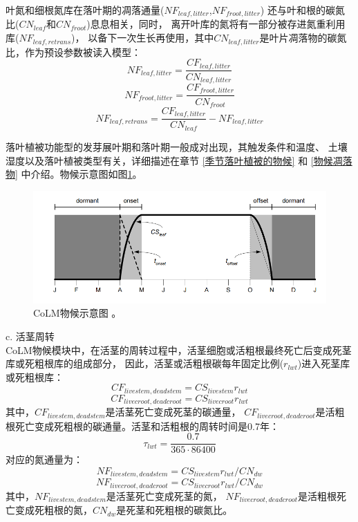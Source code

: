 叶氮和细根氮库在落叶期的凋落通量($NF_{leaf,litter}$,$NF_{froot,litter}$)
还与叶和根的碳氮比($CN_{leaf}$和$CN_{froot}$)息息相关，同时，
离开叶库的氮将有一部分被存进氮重利用库($NF_{leaf,retrans}$)，
以备下一次生长再使用，其中$CN_{leaf,litter}$是叶片凋落物的碳氮比，作为预设参数被读入模型：
\begin{equation}
N F_{leaf,litter}=\frac{CF_{leaf,litter}}{CN_{leaf,litter}}
\end{equation}
\begin{equation}
N F_{froot,litter}=\frac{CF_{froot,litter}}{CN_{froot}}
\end{equation}
\begin{equation}
N F_{leaf, retrans}=\frac{CF_{leaf,litter}}{CN_{leaf}}-NF_{leaf,litter}
\end{equation}


落叶植被功能型的发芽展叶期和落叶期一般成对出现，其触发条件和温度、
土壤湿度以及落叶植被类型有关，详细描述在章节 \ref{季节落叶植被的物候} 和 \ref{物候凋落物} 中介绍。物候示意图如图\ref{fig:CoLM物候示意图}。\\

{
\begin{figure}[]
\centering
\includegraphics{Figures/植被生物地球化学循环过程/CoLM物候示意图.png}
\caption{CoLM物候示意图 \citep{lawrence2018}。 }
\label{fig:CoLM物候示意图}
\end{figure}
}
c. 活茎周转\\
CoLM物候模块中，在活茎的周转过程中，活茎细胞或活粗根最终死亡后变成死茎库或死粗根库的组成部分，
因此，活茎或活粗根碳每年固定比例($r_{lwt}$)进入死茎库或死粗根库：
\begin{equation}
CF_{ {livestem,deadstem }}=CS_{ {livestem }} r_{l w t}
\end{equation}
\begin{equation}
CF_{ {livecroot,deadcroot }}=CS_{ {livecroot }} r_{ {lwt }}
\end{equation}
其中，$CF_{livestem,deadstem}$是活茎死亡变成死茎的碳通量，
$CF_{livecroot,deadcroot}$是活粗根死亡变成死粗根的碳通量。活茎和活粗根的周转时间是0.7年：
\begin{equation}
  \tau_{l w t}=\frac{0.7}{365 \cdot 86400}
  \end{equation}
  对应的氮通量为：
  \begin{equation}
N F_{livestem,deadstem}=CS_{livestem} r_{l w t} / CN_{d w}
\end{equation}
\begin{equation}
N F_{livecroot,deadcroot}=CS_{livecroot} r_{lwt} / CN_{d w}
\end{equation}
其中，$NF_{livestem,deadstem}$是活茎死亡变成死茎的氮，
$NF_{livecroot,deadcroot}$是活粗根死亡变成死粗根的氮，$CN_{dw}$是死茎和死粗根的碳氮比。



